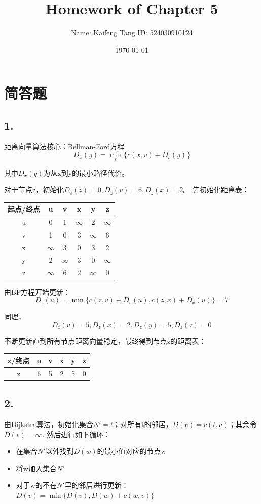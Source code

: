 \documentclass[11pt]{article}
\title{\textbf{Homework of Chapter 5}}
\author{Name: Kaifeng Tang \quad ID: 524030910124}
\date{\today}
\begin{document}
\maketitle 
\section*{简答题}
\subsection*{1. } 
距离向量算法核心：Bellman-Ford方程\[D_x(y) = \min_v \{c(x, v) + D_v(y)\}\]

其中$D_x(y)$为从x到y的最小路径代价。

对于节点z，初始化$D_z(z) = 0, D_z(v) = 6, D_z(x) = 2$。
先初始化距离表：
\begin{table}[!htbp]
    \centering
    \renewcommand{\arraystretch}{1.3}
    \begin{tabular}{c c c c c c}
        \toprule
        起点/终点 & u & v & x & y & z \\
        \midrule
        u & 0 & 1 & $\infty$ & 2 & $\infty$ \\
        v & 1 & 0 & 3 & $\infty$ & 6 \\
        x & $\infty$ & 3 & 0 & 3 & 2 \\
        y & 2 & $\infty$ & 3 & 0 & $\infty$ \\
        z & $\infty$ & 6 & 2 & $\infty$ & 0 \\
        \bottomrule
    \end{tabular}
\end{table}

由BF方程开始更新：
\[D_z(u) = \min\{c(z, v)+D_v(u), c(z,x)+D_x(u)\} = 7\]

同理， 
\[D_z(v) = 5, D_z(x) = 2, D_z(y) = 5, D_z(z) = 0\]

不断更新直到所有节点距离向量稳定，最终得到节点z的距离表：
\begin{table}[!htbp]
    \centering
    \renewcommand{\arraystretch}{1.3}
    \begin{tabular}{c c c c c c}
        \toprule
        z/终点 & u & v & x & y & z \\
        \midrule
        z & 6 & 5 & 2 & 5 & 0 \\
        \bottomrule
    \end{tabular}
\end{table}

\subsection*{2. }
由Dijkstra算法，初始化集合$N'={t}$；对所有t的邻居，$D(v) = c(t, v)$；其余令$D(v) = \infty$.
然后进行如下循环：
\begin{itemize}
    \item 在集合$N'$以外找到$D(w)$的最小值对应的节点w
    \item 将w加入集合$N'$
    \item 对于w的不在$N'$里的邻居进行更新：$D(v) = \min\{D(v), D(w) + c(w, v)\}$ 
\end{itemize}
\end{document}
